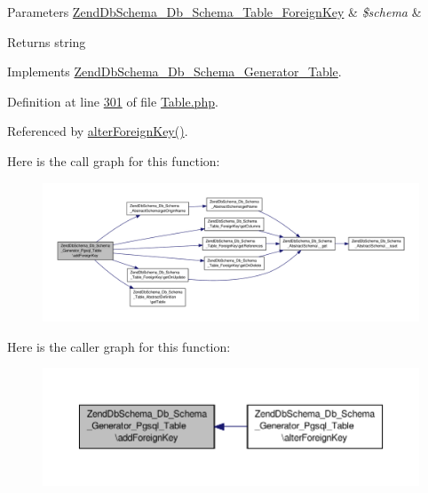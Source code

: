 \begin{DoxyParams}[1]{Parameters}
\hyperlink{classZendDbSchema__Db__Schema__Table__ForeignKey}{Zend\-Db\-Schema\-\_\-\-Db\-\_\-\-Schema\-\_\-\-Table\-\_\-\-Foreign\-Key} & {\em \$schema} & \\
\hline
\end{DoxyParams}
\begin{DoxyReturn}{Returns}
string 
\end{DoxyReturn}


Implements \hyperlink{interfaceZendDbSchema__Db__Schema__Generator__Table_aff7ec9002b094d3a62ec8bc79cf47931}{Zend\-Db\-Schema\-\_\-\-Db\-\_\-\-Schema\-\_\-\-Generator\-\_\-\-Table}.



Definition at line \hyperlink{Generator_2Pgsql_2Table_8php_source_l00301}{301} of file \hyperlink{Generator_2Pgsql_2Table_8php_source}{Table.\-php}.



Referenced by \hyperlink{Generator_2Pgsql_2Table_8php_source_l00335}{alter\-Foreign\-Key()}.



Here is the call graph for this function\-:\nopagebreak
\begin{figure}[H]
\begin{center}
\leavevmode
\includegraphics[width=350pt]{classZendDbSchema__Db__Schema__Generator__Pgsql__Table_a3365ef877cee87ce2f038f4476256a94_cgraph}
\end{center}
\end{figure}




Here is the caller graph for this function\-:\nopagebreak
\begin{figure}[H]
\begin{center}
\leavevmode
\includegraphics[width=350pt]{classZendDbSchema__Db__Schema__Generator__Pgsql__Table_a3365ef877cee87ce2f038f4476256a94_icgraph}
\end{center}
\end{figure}


